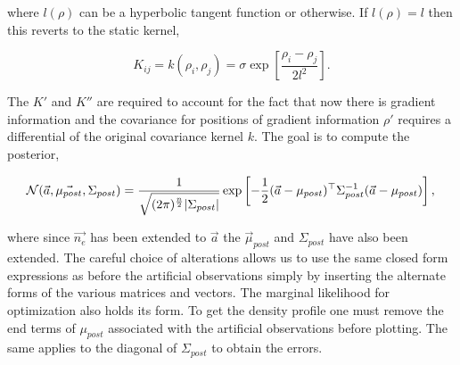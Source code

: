\noindent where $l(\rho)$ can be a hyperbolic tangent function or otherwise. If $l(\rho) = l$ then this reverts to the static kernel,

\begin{equation}
K_{ij} = k(\rho_i, \rho_j) = \sigma \exp\left[{\frac{\rho_i - \rho_j}{2l^2}}\right].
\end{equation}

\noindent The $K'$  and $K''$ are required to account for the fact that now there is gradient information and the covariance for positions of gradient information $\rho'$ requires a differential of the original covariance kernel $k$. The goal is to compute the posterior,  

\begin{equation}
\mathcal{N}(\vec{a}, \vec{\mu_{post}}, \Sigma_{post}) = \frac{1}{\sqrt{(2\pi)^{\frac{n}{2}}|\Sigma_{post}|}} \exp \left[{{-\frac{1}{2}(\vec{a}-\mu_{post})^\top\Sigma_{post}^{-1}(\vec{a}-\mu_{post})}}\right],\\
\end{equation}

\noindent where since $\vec{n_e}$ has been extended to $\vec a$ the $\vec \mu_{post}$ and $\Sigma_{post}$ have also been extended. The careful choice of alterations allows us to use the same closed form expressions as before the artificial observations simply by inserting the alternate forms of the various matrices and vectors. The marginal likelihood for optimization also holds its form. To get the density profile one must remove the end terms of $\mu_{post}$ associated with the artificial observations before plotting. The same applies to the diagonal of $\Sigma_{post}$ to obtain the errors. 